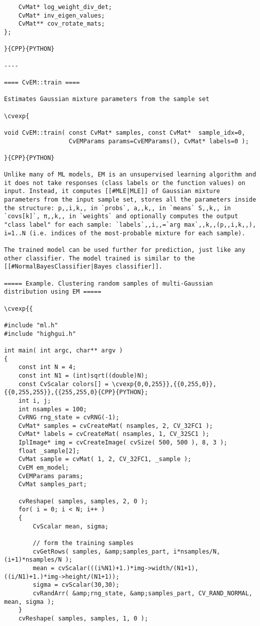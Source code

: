 \begin{verbatim}
    CvMat* log_weight_div_det;
    CvMat* inv_eigen_values;
    CvMat** cov_rotate_mats;
};

}{CPP}{PYTHON}

----

==== CvEM::train ====

Estimates Gaussian mixture parameters from the sample set

\cvexp{

void CvEM::train( const CvMat* samples, const CvMat*  sample_idx=0,
                  CvEMParams params=CvEMParams(), CvMat* labels=0 );

}{CPP}{PYTHON}

Unlike many of ML models, EM is an unsupervised learning algorithm and it does not take responses (class labels or the function values) on input. Instead, it computes [[#MLE|MLE]] of Gaussian mixture parameters from the input sample set, stores all the parameters inside the structure: p,,i,k,, in `probs`, a,,k,, in `means` S,,k,, in `covs[k]`, π,,k,, in `weights` and optionally computes the output "class label" for each sample: `labels`,,i,,=`arg max`,,k,,(p,,i,k,,), i=1..N (i.e. indices of the most-probable mixture for each sample).

The trained model can be used further for prediction, just like any other classifier. The model trained is similar to the [[#NormalBayesClassifier|Bayes classifier]].

===== Example. Clustering random samples of multi-Gaussian distribution using EM =====

\cvexp{{

#include "ml.h"
#include "highgui.h"

int main( int argc, char** argv )
{
    const int N = 4;
    const int N1 = (int)sqrt((double)N);
    const CvScalar colors[] = \cvexp{0,0,255}},{{0,255,0}},{{0,255,255}},{{255,255,0}{CPP}{PYTHON};
    int i, j;
    int nsamples = 100;
    CvRNG rng_state = cvRNG(-1);
    CvMat* samples = cvCreateMat( nsamples, 2, CV_32FC1 );
    CvMat* labels = cvCreateMat( nsamples, 1, CV_32SC1 );
    IplImage* img = cvCreateImage( cvSize( 500, 500 ), 8, 3 );
    float _sample[2];
    CvMat sample = cvMat( 1, 2, CV_32FC1, _sample );
    CvEM em_model;
    CvEMParams params;
    CvMat samples_part;

    cvReshape( samples, samples, 2, 0 );
    for( i = 0; i < N; i++ )
    {
        CvScalar mean, sigma;

        // form the training samples
        cvGetRows( samples, &amp;samples_part, i*nsamples/N, (i+1)*nsamples/N );
        mean = cvScalar(((i%N1)+1.)*img->width/(N1+1), ((i/N1)+1.)*img->height/(N1+1));
        sigma = cvScalar(30,30);
        cvRandArr( &amp;rng_state, &amp;samples_part, CV_RAND_NORMAL, mean, sigma );
    }
    cvReshape( samples, samples, 1, 0 );


\end{verbatim}
